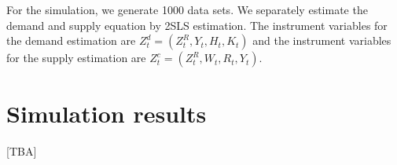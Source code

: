 \documentclass[11pt, a4paper]{article}
\begin{document}
For the simulation, we generate 1000 data sets. We separately estimate the demand and supply equation by 2SLS estimation.
The instrument variables for the demand estimation are $Z^{d}_{t} = (Z^{R}_{t}, Y_t, H_{t}, K_{t})$ and the instrument variables for the supply estimation are $Z^{c}_{t} = (Z^{R}_{t}, W_{t}, R_t, Y_t)$. 


\section{Simulation results}\label{sec:results}
[TBA]


\end{document}
